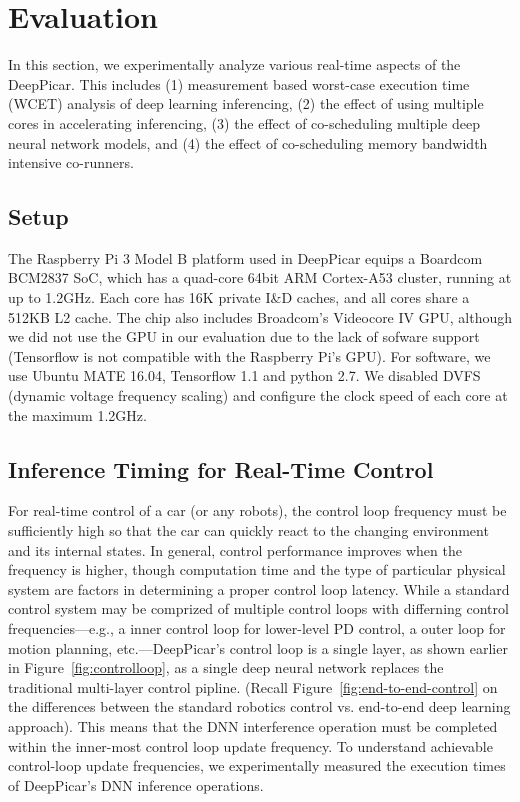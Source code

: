 
\section{Evaluation}\label{sec:evaluation}

In this section, we experimentally analyze various real-time aspects
of the DeepPicar. This includes
(1) measurement based worst-case execution time (WCET) analysis of
deep learning inferencing,
(2) the effect of using multiple cores in accelerating inferencing,
(3) the effect of co-scheduling multiple deep neural network models,
and 
(4) the effect of co-scheduling memory bandwidth intensive co-runners.

\subsection{Setup}

The Raspberry Pi 3 Model B platform used in DeepPicar equips a Boardcom
BCM2837 SoC, which has a quad-core 64bit ARM Cortex-A53 cluster,
running at up to 1.2GHz. Each core has 16K private I\&D caches, and all
cores share a 512KB L2 cache.
The chip also includes Broadcom's Videocore IV
GPU, although we did not use the GPU in our evaluation due to the lack
of sofware support (Tensorflow is not compatible with the Raspberry Pi's GPU).
For software, we use Ubuntu MATE 16.04, Tensorflow 1.1 and python
2.7. We disabled DVFS (dynamic voltage frequency scaling) and
configure the clock speed of each core at the maximum 1.2GHz.

\subsection{Inference Timing for Real-Time Control}

For real-time control of a car (or any robots), the control loop
frequency must be sufficiently high so that the car can quickly
react to the changing environment and its internal states. In general,
control performance improves when the frequency is higher, though
computation time and the type of particular physical system are
factors in determining a proper control loop latency. While a standard
control system may be comprized of multiple control loops with
differning control frequencies---e.g., a inner control loop for lower-level
PD control, a outer loop for motion planning, etc.---DeepPicar's
control loop is a single layer, as shown earlier in
Figure~\ref{fig:controlloop}, as a single deep neural network
replaces the traditional multi-layer control pipline. (Recall
Figure~\ref{fig:end-to-end-control} on the differences between the
standard robotics control vs. end-to-end deep learning approach).
This means that the DNN interference operation must be completed
within the inner-most control loop update frequency. To understand
achievable control-loop update frequencies, we experimentally measured
the execution times of DeepPicar's DNN inference operations.

